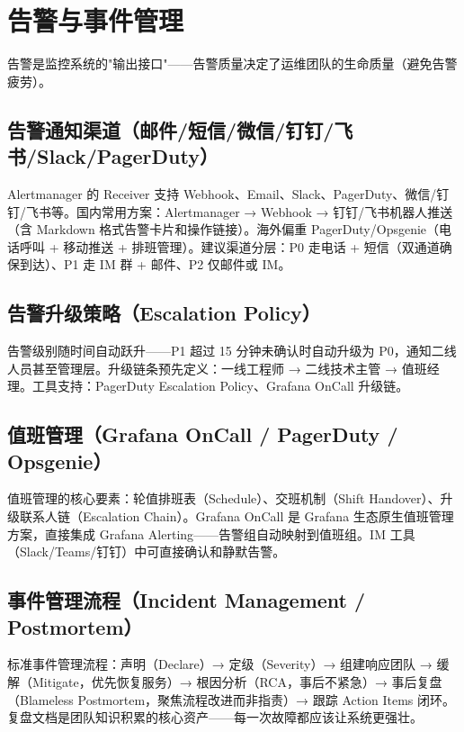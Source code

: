 \documentclass[12pt,UTF8]{ctexbook}
\begin{document}
\chapter{告警与事件管理}
\label{chap:alerting}

告警是监控系统的"输出接口"——告警质量决定了运维团队的生命质量（避免告警疲劳）。

  \section{告警通知渠道（邮件/短信/微信/钉钉/飞书/Slack/PagerDuty）}

Alertmanager 的 Receiver 支持 Webhook、Email、Slack、PagerDuty、微信/钉钉/飞书等。国内常用方案：Alertmanager → Webhook → 钉钉/飞书机器人推送（含 Markdown 格式告警卡片和操作链接）。海外偏重 PagerDuty/Opsgenie（电话呼叫 + 移动推送 + 排班管理）。建议渠道分层：P0 走电话 + 短信（双通道确保到达）、P1 走 IM 群 + 邮件、P2 仅邮件或 IM。

  \section{告警升级策略（Escalation Policy）}

告警级别随时间自动跃升——P1 超过 15 分钟未确认时自动升级为 P0，通知二线人员甚至管理层。升级链条预先定义：一线工程师 → 二线技术主管 → 值班经理。工具支持：PagerDuty Escalation Policy、Grafana OnCall 升级链。

  \section{值班管理（Grafana OnCall / PagerDuty / Opsgenie）}

值班管理的核心要素：轮值排班表（Schedule）、交班机制（Shift Handover）、升级联系人链（Escalation Chain）。Grafana OnCall 是 Grafana 生态原生值班管理方案，直接集成 Grafana Alerting——告警组自动映射到值班组。IM 工具（Slack/Teams/钉钉）中可直接确认和静默告警。

  \section{事件管理流程（Incident Management / Postmortem）}

标准事件管理流程：声明（Declare）→ 定级（Severity）→ 组建响应团队 → 缓解（Mitigate，优先恢复服务）→ 根因分析（RCA，事后不紧急）→ 事后复盘（Blameless Postmortem，聚焦流程改进而非指责）→ 跟踪 Action Items 闭环。复盘文档是团队知识积累的核心资产——每一次故障都应该让系统更强壮。
\end{document}
